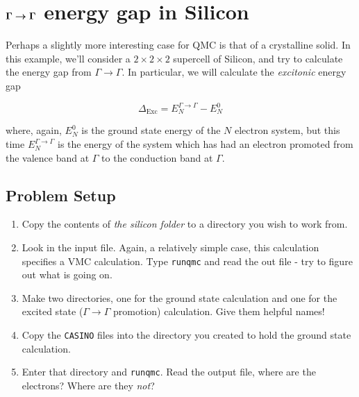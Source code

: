 \documentclass[12pt, a4paper]{article}
\begin{document}
\section{$\bf\Gamma \boldsymbol\rightarrow \Gamma$ energy gap in Silicon}

Perhaps a slightly more interesting case for QMC is that of a crystalline
solid. In this example, we'll consider a $2\times 2\times 2$ supercell of
Silicon, and try to calculate the energy gap from $\Gamma \rightarrow \Gamma$.
In particular, we will calculate the \textit{excitonic} energy gap

\begin{equation}
  \Delta_{\text{Exc}} = E^{\Gamma \rightarrow \Gamma}_{N} - E^{0}_{N}
\end{equation}

\noindent
where, again, $E^{0}_{N}$ is the ground state energy of the $N$ electron
system, but this time $E^{\Gamma \rightarrow \Gamma}_{N}$ is the energy of the
system which has had an electron promoted from the valence band at $\Gamma$ to
the conduction band at $\Gamma$.

\subsection{Problem Setup}\label{sub:problem_setup_2}

\begin{enumerate}
  \item Copy the contents of \textit{the silicon folder} to
  a directory you wish to work from.

  \item Look in the input file. Again, a relatively simple case, this
  calculation specifies a VMC calculation. Type \texttt{runqmc} and read the
  out file - try to figure out what is going on.

  \item Make two directories, one for the ground state calculation and one for
  the excited state ($\Gamma \rightarrow \Gamma$ promotion) calculation. Give
  them helpful names!

  \item Copy the \texttt{CASINO} files into the directory you created to hold
  the ground state calculation.

  \item Enter that directory and \texttt{runqmc}. Read the output file, where
  are the electrons? Where are they \textit{not}?

\end{enumerate}
\end{document}
